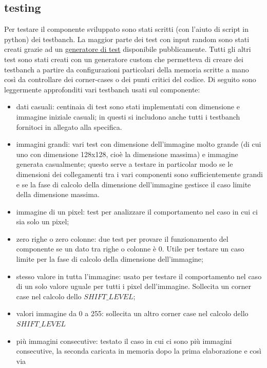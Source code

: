 \documentclass[11pt]{article} %
\begin{document}
\subsection{testing}
Per testare il componente sviluppato sono stati scritti (con l'aiuto di script in python) dei testbanch. La maggior parte dei test con input random sono stati creati grazie ad un \href{https://github.com/davidemerli/RL-generator-2020-2021.git}{generatore di test} disponibile pubblicamente. Tutti gli altri test sono stati creati con un generatore custom che permetteva di creare dei testbanch a partire da configurazioni particolari della memoria scritte a mano così da controllare dei corner-cases o dei punti critici del codice. Di seguito sono leggermente approfonditi vari testbanch usati sul componente:

\begin{itemize}
\item dati casuali: centinaia di test sono stati implementati con dimensione e immagine iniziale casuali; in questi si includono anche tutti i testbanch fornitoci in allegato alla specifica. 
\item immagini grandi: vari test con dimensione dell'immagine molto grande (di cui uno con dimensione 128x128, cioè la dimensione massima) e immagine generata casualmente; questo serve a testare in particolar modo se le dimensioni dei collegamenti tra i vari componenti sono sufficientemente grandi e se la fase di calcolo della dimensione dell'immagine gestisce il caso limite della dimensione massima.
\item immagine di un pixel: test per analizzare il comportamento nel caso in cui ci sia solo un pixel;
\item zero righe o zero colonne: due test per provare il funzionamento del componente se un dato tra righe o colonne è 0. Utile per testare un caso limite per la fase di calcolo della dimensione dell'immagine;
\item stesso valore in tutta l'immagine: usato per testare il comportamento nel caso di un solo valore uguale per tutti i pixel dell'immagine. Sollecita un corner case nel calcolo dello $SHIFT\_LEVEL$;
\item valori immagine da 0 a 255: sollecita un altro corner case nel calcolo dello $SHIFT\_LEVEL$
\item più immagini consecutive: testato il caso in cui ci sono più immagini consecutive, la seconda caricata in memoria dopo la prima elaborazione e così via
\end{itemize}
\end{document}
